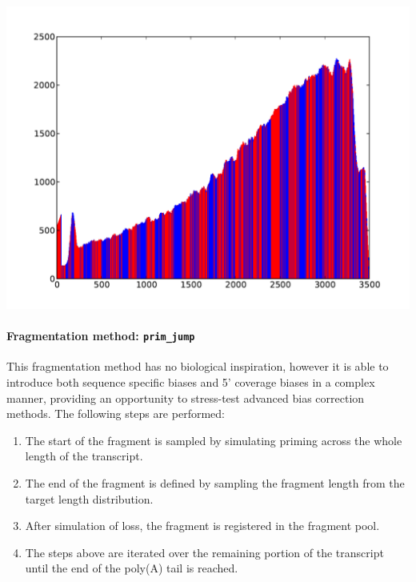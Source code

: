 \begin{center}
\includegraphics[scale=0.6,page=1]{../src/test/cov/cov_pre_prim.pdf}
\end{center}


\paragraph{{Fragmentation method: }\texttt{prim\_jump}}

This fragmentation method has no biological inspiration, however it is able to introduce both sequence specific biases and 5' coverage biases in a complex manner, providing an opportunity to stress-test advanced bias correction methods.
The following steps are performed:

\begin{enumerate}
    \item{The start of the fragment is sampled by simulating priming across the whole length of the transcript.}
    \item{The end of the fragment is defined by sampling the fragment length from the target length distribution.}
    \item{After simulation of loss, the fragment is registered in the fragment pool.}
    \item{The steps above are iterated over the remaining portion of the transcript until the end of the poly(A) tail is reached.}
\end{enumerate}

